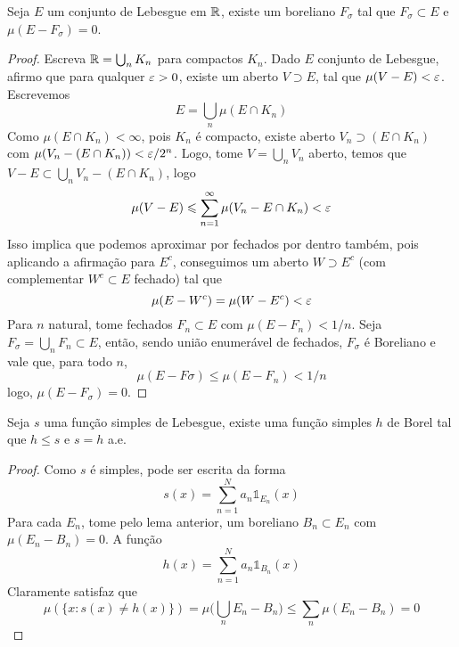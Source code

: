 \begin{lemma}
    \label{lemm:borel_approx}
    Seja $E$ um conjunto de Lebesgue em $\mathbb{R}$, existe um boreliano $F_\sigma$
    tal que $F_\sigma \subset E$ e $\mu(E - F_\sigma) = 0$.
\end{lemma}
\begin{proof}
    Escreva $\mathbb{R} = \bigcup_n K_n$ para compactos $K_n$. Dado $E$ conjunto de Lebesgue, afirmo que para 
    qualquer $\varepsilon > 0$, existe um aberto $V \supset E$, tal que $\mu(V - E) < \varepsilon$. Escrevemos 
    $$E = \bigcup_n \mu(E \cap K_n)$$
    Como $\mu(E \cap K_n) < \infty$, pois $K_n$ é compacto, existe aberto $V_n \supset (E \cap K_n)$ com $\mu(V_n - (E \cap K_n)) < \varepsilon/2^n$.
    Logo, tome $V = \bigcup_n V_n$ aberto, temos que $V - E \subset \bigcup_n V_n - (E \cap K_n)$, logo 
    $$\mu(V - E) \leqslant \sum_{n=1}^{\infty} \mu(V_n - E \cap K_n) < \varepsilon$$
    Isso implica que podemos aproximar por fechados por dentro também, pois aplicando a afirmação 
    para $E^c$, conseguimos um aberto $W \supset E^c$ (com complementar $W^c \subset E$ fechado) tal que
    $$\mu(E - W^c) = \mu(W - E^c) < \varepsilon$$
    Para $n$ natural, tome fechados $F_n \subset E$ com $\mu(E - F_n) < 1/n$. Seja $F_\sigma = \bigcup_n F_n \subset E$,
    então, sendo união enumerável de fechados, $F_\sigma$ é Boreliano e vale que, para todo $n$,
    $$\mu(E - F\sigma) \leq \mu(E - F_n) < 1/n$$
    logo, $\mu(E - F_\sigma) = 0$.
    
\end{proof}
\begin{lemma}
    Seja $s$ uma função simples de Lebesgue, existe uma função simples $h$ de Borel tal que $h \leq s$ e
    $s = h$ a.e.
\end{lemma}
\begin{proof}
    Como $s$ é simples, pode ser escrita da forma
    $$s(x) = \sum_{n = 1}^{N} a_n \mathds{1}_{E_n}(x)$$
    Para cada $E_n$, tome pelo lema anterior, um boreliano $B_n \subset E_n$ com $\mu(E_n - B_n) = 0$. A função
    $$h(x) = \sum_{n=1}^{N} a_n \mathds{1}_{B_n}(x)$$
    Claramente satisfaz que 
    $$\mu(\{x : s(x) \neq h(x)\}) = \mu\bigg(\bigcup_n E_n - B_n \bigg) \leq \sum_{n} \mu(E_n - B_n) = 0$$
\end{proof}

